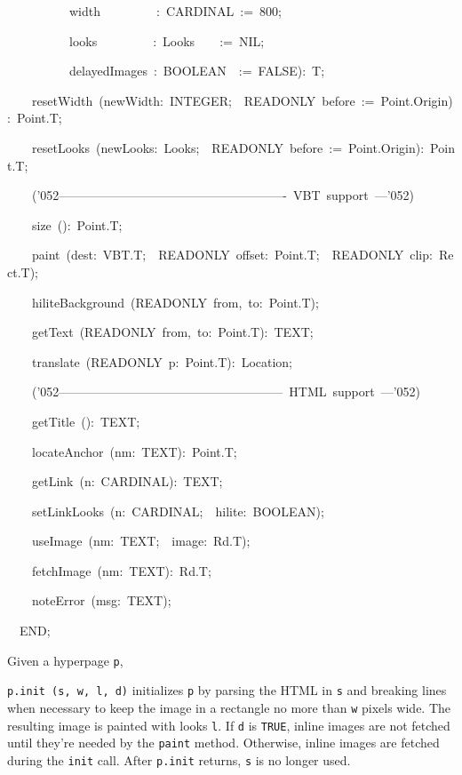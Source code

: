 {{\tab ~~~~~~~~~~width~~~~~~~~~:~CARDINAL~:=~800;\par
\tab ~~~~~~~~~~looks~~~~~~~~~:~Looks~~~~:=~NIL;\par
\tab ~~~~~~~~~~delayedImages~:~BOOLEAN~~:=~FALSE):~T;\par\medskip
\tab ~~~~resetWidth~(newWidth:~INTEGER;~~READONLY~before~:=~Point.Origin):~Point.T;\par
\tab ~~~~resetLooks~(newLooks:~Looks;~~READONLY~before~:=~Point.Origin):~Point.T;\par\medskip
\tab ~~~~(\char'052{}-------------------------------------------------------~VBT~support~---\char'052{})\par\medskip
\tab ~~~~size~():~Point.T;\par
\tab ~~~~paint~(dest:~VBT.T;~~READONLY~offset:~Point.T;~~READONLY~clip:~Rect.T);\par
\tab ~~~~hiliteBackground~(READONLY~from,~to:~Point.T);\par
\tab ~~~~getText~(READONLY~from,~to:~Point.T):~TEXT;\par
\tab ~~~~translate~(READONLY~p:~Point.T):~Location;\par\medskip
\tab ~~~~(\char'052{}------------------------------------------------------~HTML~support~---\char'052{})\par\medskip
\tab ~~~~getTitle~():~TEXT;\par
\tab ~~~~locateAnchor~(nm:~TEXT):~Point.T;\par
\tab ~~~~getLink~(n:~CARDINAL):~TEXT;\par
\tab ~~~~setLinkLooks~(n:~CARDINAL;~~hilite:~BOOLEAN);\par
\tab ~~~~useImage~(nm:~TEXT;~~image:~Rd.T);\par
\tab ~~~~fetchImage~(nm:~TEXT):~Rd.T;\par
\tab ~~~~noteError~(msg:~TEXT);\par\medskip
\tab ~~END;}\par\medskip\noindent
{\rm  Given a hyperpage {\tt p},
\par
   {\tt p.init (s, w, l, d)} initializes {\tt p} by parsing the HTML in {\tt s}
   and breaking lines when necessary to keep the image in a rectangle
   no more than {\tt w} pixels wide.  The resulting image is painted
   with looks {\tt l}.  If {\tt d} is {\tt TRUE}, inline images are not fetched
   until they're needed by the {\tt paint} method.  Otherwise, inline images
   are fetched during the {\tt init} call.  After {\tt p.init} returns, {\tt s} is
   no longer used.
\par
}}
